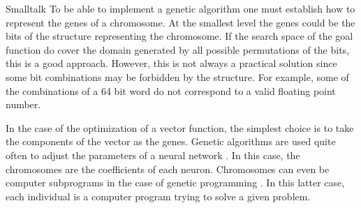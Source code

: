 \begin{displaycode}{Smalltalk}
 To be able to
implement a genetic algorithm one must establish how to represent
the genes of a chromosome. At the smallest level the genes could
be the bits of the structure representing the chromosome. If the
search space of the goal function do cover the domain generated by
all possible permutations of the bits, this is a good approach.
However, this is not always a practical solution since some bit
combinations may be forbidden by the structure. For example, some
of the combinations of a 64 bit word do not correspond to a valid
floating point number.

In the case of the optimization of a vector function, the simplest
choice is to take the components of the vector as the genes.
Genetic algorithms are used quite often to adjust the parameters
of a neural network \cite{BerLin}. In this case, the chromosomes
are the coefficients of each neuron. Chromosomes can even be
computer subprograms in the case of genetic programming
\cite{Koza}. In this latter case, each individual is a computer
program trying to solve a given problem.


\end{displaycode}
